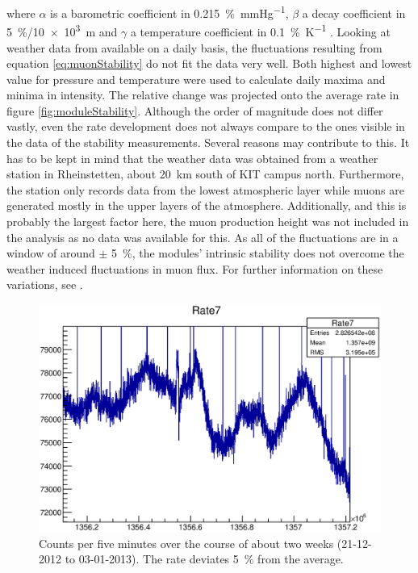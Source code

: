   where $\alpha$ is a barometric coefficient in \SI{0.215}{\percent\per\mmHg}, $\beta$ a decay coefficient in \SI{5}{\percent}/\SI{10e3}{\meter} and $\gamma$ a temperature coefficient in \SI{0.1}{\percent\per\kelvin} \cite{muonIntensity}.
  Looking at weather data from \cite{wetterCom} available on a daily basis, the fluctuations resulting from equation \ref{eq:muonStability} do not fit the data very well. Both highest and lowest value for pressure and temperature were used to calculate daily maxima and minima in intensity. The relative change was projected onto the average rate in figure \ref{fig:moduleStability}. Although the order of magnitude does not differ vastly, even the rate development does not always compare to the ones visible in the data of the stability measurements. Several reasons may contribute to this. It has to be kept in mind that the weather data was obtained from a weather station in Rheinstetten, about \SI{20}{\kilo\meter} south of KIT campus north. Furthermore, the station only records data from the lowest atmospheric layer while muons are generated mostly in the upper layers of the atmosphere. Additionally, and this is probably the largest factor here, the muon production height was not included in the analysis as no data was available for this. As all of the fluctuations are in a window of around $\pm$ \SI{5}{\percent}, the modules' intrinsic stability does not overcome the weather induced fluctuations in muon flux. For further information on these variations, see \cite{fluxVariation}.
  \begin{figure}
  \centering
	\includegraphics[width = 0.9 \textwidth]{graphics/setup/stability.eps}
  	\caption[Muon module stability]{Counts per five minutes over the course of about two weeks (21-12-2012 to 03-01-2013). The rate deviates \SI{5}{\percent} from the average.}
  \end{figure}

